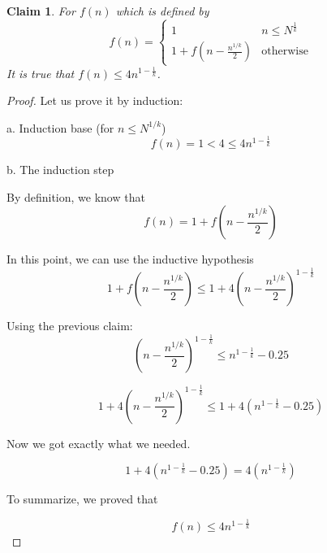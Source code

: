 \documentclass{article}
\theoremstyle{plain}
\newtheorem{claim}{Claim}
\begin{document}
\begin{claim}
    For $f(n)$ which is defined by \newline
    \begin{equation*}
        f(n) = \begin{cases}
               1               & n \leq N^{\frac{1}{k}}\\
               1 + f(n - \frac{n^{1/k}}{2}) & \text{otherwise}
           \end{cases}
    \end{equation*}
    It is true that $f(n) \leq 4n^{1-\frac{1}{k}}$.
\end{claim}
\begin{proof}
Let us prove it by induction: \newline

a. Induction base (for $n \leq N^{1/k}$)\newline
\begin{equation*}
   f(n) = 1 < 4 \leq 4n^{1-\frac{1}{k}}
\end{equation*}

b. The induction step\newline

By definition, we know that \newline
\begin{equation*}
  f(n) = 1 + f(n - \frac{n^{1/k}}{2})
\end{equation*}

In this point, we can use the inductive hypothesis \newline
\begin{equation*}
  1 + f(n - \frac{n^{1/k}}{2}) \leq 1 + 4(n - \frac{n^{1/k}}{2})^{1-\frac{1}{k}}
\end{equation*}

Using the previous claim:
\begin{equation*}
   (n - \frac{n^{1/k}}{2})^{1-\frac{1}{k}} \leq n^{1-\frac{1}{k}}-0.25
\end{equation*}

\begin{equation*}
  1 + 4(n - \frac{n^{1/k}}{2})^{1-\frac{1}{k}} \leq 1 + 4(n^{1-\frac{1}{k}}-0.25)
\end{equation*}

Now we got exactly what we needed. \newline

\begin{equation*}
  1 + 4(n^{1-\frac{1}{k}}-0.25) = 4(n^{1-\frac{1}{k}})
\end{equation*}

To summarize, we proved that \newline

\begin{equation*}
  f(n) \leq 4n^{1-\frac{1}{k}}
\end{equation*}

\end{proof}
\end{document}
